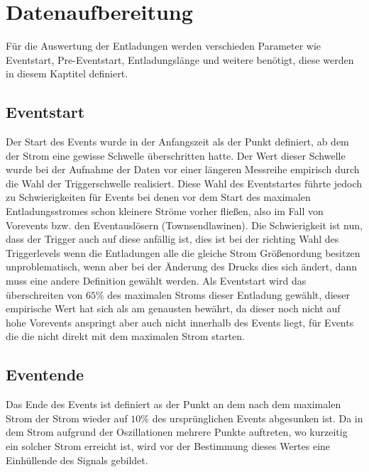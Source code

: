 \chapter{Datenaufbereitung}
\label{chap:features}

Für die Auswertung der Entladungen werden verschieden Parameter wie Eventstart, Pre-Eventstart, Entladungslänge und weitere benötigt, diese werden in diesem Kaptitel definiert.

\section{Eventstart}
\label{sec:eventstart}

Der Start des Events wurde in der Anfangszeit als der Punkt definiert, ab dem der Strom eine gewisse Schwelle überschritten hatte. Der Wert dieser Schwelle wurde bei der Aufnahme der Daten vor einer längeren Messreihe empirisch durch die Wahl der Triggerschwelle realisiert. Diese Wahl des Eventstartes führte jedoch zu Schwierigkeiten für Events bei denen vor dem Start des maximalen Entladungsstromes schon kleinere Ströme vorher fließen, also im Fall von Vorevents bzw. den Eventauslösern (Townsendlawinen). Die Schwierigkeit ist nun, dass der Trigger auch auf diese anfällig ist, dies ist bei der richting Wahl des Triggerlevels wenn die Entladungen alle die gleiche Strom Größenordung besitzen unproblematisch, wenn aber bei der Änderung des Drucks dies sich ändert, dann muss eine andere Definition gewählt werden. Als Eventstart wird das überschreiten von $65 \%$ des maximalen Stroms dieser Entladung gewählt, dieser empirische Wert hat sich als am genausten bewährt, da dieser noch nicht auf hohe Vorevents anspringt aber auch nicht innerhalb des Events liegt, für Events die die nicht direkt mit dem maximalen Strom starten. 

\section{Eventende}
\label{sec:eventende}
Das Ende des Events ist definiert as der Punkt an dem nach dem maximalen Strom der Strom wieder auf \(10\%\) des ursprünglichen Events abgesunken ist. Da in dem Strom aufgrund der Oszillationen mehrere Punkte auftreten, wo kurzeitig ein solcher Strom erreicht ist, wird vor der Bestimmung dieses Wertes eine Einhüllende des Signals gebildet. 

